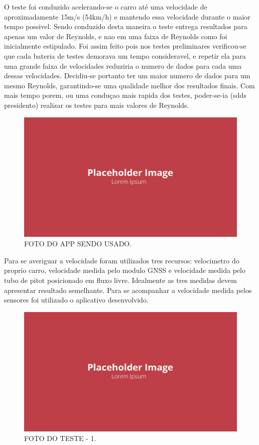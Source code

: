 O teste foi conduzido acelerando-se o carro até uma velocidade de aproximadamente 15m/s (54km/h) e mantendo essa velocidade durante o maior tempo possivel. Sendo conduzido desta maneira o teste entrega resultados para apenas um valor de Reynolds, e nao em uma faixa de Reynolds como foi inicialmente estipulado. Foi assim feito pois nos testes preliminares verificou-se que cada bateria de testes demorava um tempo consideravel, e repetir ela para uma grande faixa de velocidades reduziria o numero de dados para cada uma dessas velocidades. Decidiu-se portanto ter um maior numero de dados para um mesmo Reynolds, garantindo-se uma qualidade melhor dos resultados finais. Com mais tempo porem, ou uma conduçao mais rapida dos testes, poder-se-ia (sdds presidento) realizar os testes para mais valores de Reynolds.  

\begin{figure}[!ht]
    \centering
    \includegraphics[width=.8\linewidth]{figuras/placeholder.png}
    \caption{FOTO DO APP SENDO USADO\cite{autor}.}
    \label{fig:placeholder}
\end{figure}

Para se averiguar a velocidade foram utilizados tres recursos: velocimetro do proprio carro, velocidade medida pelo modulo GNSS e velocidade medida pelo tubo de pitot posicionado em fluxo livre. Idealmente as tres medidas devem apresentar resultado semelhante. Para se acompanhar a velocidade medida pelos sensores foi utilizado o aplicativo desenvolvido.

\begin{figure}[!ht]
    \centering
    \includegraphics[width=.8\linewidth]{figuras/placeholder.png}
    \caption{FOTO DO TESTE - 1\cite{autor}.}
    \label{fig:placeholder}
\end{figure}

